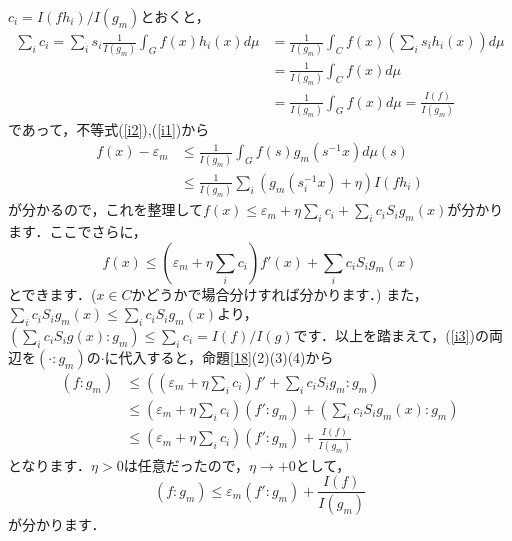 \begin{Proof}
$c_i=I(fh_i)/I(g_{m})$とおくと，
\begin{align*}
\sum_{i}c_{i}=\sum_{i}s_{i}  \frac{1}{I(g_{m})} \int_{G}f(x)h_{i}(x)d\mu & = \frac{1}{I(g_{m})}\int_{C}f(x) \left( \sum_{i}s_{i}h_{i}(x) \right) d\mu \\
 & =\frac{1}{I(g_{m})}\int_{C}f(x) d\mu \\
 & =\frac{1}{I(g_{m})}\int_{G}f(x) d\mu=\frac{I(f)}{I(g_{m})}
\end{align*}
であって，不等式(\ref{i2}),(\ref{i1})から
\begin{align*}
f(x)-\varepsilon_{m} & \le \frac{1}{I(g_{m})} \int_{G}f(s)g_{m}(s^{-1}x)d\mu(s) \\ 
 & \le \frac{1}{I(g_{m})} \sum_{i}\left( g_{m}(s_{i}^{-1}x) + \eta \right)I(fh_{i})
\end{align*}
が分かるので，これを整理して$f(x) \le \varepsilon_{m} + \eta \sum_{i}c_{i} + \sum_{i}c_{i}S_{i}g_{m}(x)$が分かります．ここでさらに，
\begin{equation}
f(x) \le \left( \varepsilon_{m} + \eta \sum_{i}c_{i} \right)f'(x) + \sum_{i}c_{i}S_{i}g_{m}(x)
\label{i3}
\end{equation}
とできます．($x \in C$かどうかで場合分けすれば分かります．) また，$\sum_{i}c_{i}S_{i}g_{m}(x) \le \sum_{i}c_{i}S_{i}g_{m}(x)$より， $\left( \sum_{i}c_{i}S_{i}g(x) : g_{m} \right) \le \sum_{i}c_{i}=I(f)/I(g)$です．以上を踏まえて，(\ref{i3})の両辺を$\left( \cdot : g_{m} \right) $の$\cdot$に代入すると，命題\ref{18}(2)(3)(4)から 
\begin{align*}
\left( f : g_{m} \right) & \le \left( \left( \varepsilon_{m} + \eta \sum_{i}c_{i} \right)f' +  \sum_{i}c_{i}S_{i}g_{m} : g_{m} \right) \\
 & \le \left( \varepsilon_{m} + \eta \sum_{i}c_{i} \right) \left( f' : g_{m} \right) + \left( \sum_{i}c_{i}S_{i}g_{m}(x) : g_{m} \right) \\
 & \le \left( \varepsilon_{m} + \eta \sum_{i}c_{i} \right) \left( f' : g_{m} \right) + \frac{I(f)}{I(g_{m})}
\end{align*}
となります．$\eta>0$は任意だったので，$\eta \to +0$として，
\begin{equation}
\left( f : g_{m} \right) \le \varepsilon_{m} \left( f' : g_{m} \right) + \frac{I(f)}{I(g_{m})}
\label{i4}
\end{equation}
が分かります．


\end{Proof}

